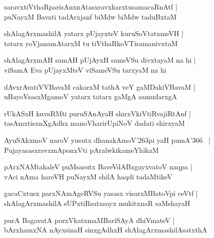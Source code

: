 \documentclass[twoside,12pt,openright]{book}
\def\S{\char'263}
\newcounter{shloka}[chapter]
\begin{document}
\begin{shloka}%
saravxtiVthaRparisAnxnAtasxravxkarxtusamacaRnAtf |\\
puNayxM Bavati tadArxjanf biMdw biMdw taduBxtaM 
\end{shloka}

\begin{shloka}%
shAlagArxmashilA yatarx pUjayxteV kuruSoVtatxmeVH |\\
tatarx yoVjanamAtarxM tu tiVthaRkoVTisamanivxtaM 
\end{shloka}

\begin{shloka}%
shAlagArxmAH samAH pUjAyxH sameVSu divxtayaM na hi |\\
viSamA Eva pUjayxMteV viSameVSu tarxyaM na hi
\end{shloka}

\begin{shloka}%
dAvxrAvatiVVBavaM cakarxM tathA veY gaMDakiVBavaM |\\
uBayoVsasxMgamoV yatarx tatarx gaMgA samudarxgA 
\end{shloka}

\begin{shloka}%
rUkASxH kuvaRMti puruSAnAyaH shirxVkiVtiRvajiRtAnf |\\
tasAmxtisxnXgAdhx manoVharirUpiNoV dadati shirxyaM 
\end{shloka}

\begin{shloka}%
AyuSAkxmoV naroV yusutx dhanakAmoV\S pi yaH pumA\char'366 ~|\\
PujayasasxravxmAponxVti pAralwkikameYhikaM 
\end{shloka}

\begin{shloka}%
pArxNAMtakaleV puMsasutx BaveVdABxgayxvatoV naqpa |\\
vAci nAma hareVH puNayxM shilA haqdi tadaMtikeV 
\end{shloka}

\begin{shloka}%
gacaCxtusx parxNAmAgeRVSu yasasx visarxMBatoVpi ceVtf |\\
shAlagArxmashilA sUPxtiRsatxsayx mukitxnaR saMshayaH 
\end{shloka}

\begin{shloka}%
purA BagavatA porxVkatxmaMBariSAyA dhiVmateV |\\
bArxhamxNA nAyxsinaH sinxgAdhxH shAlagArxmashilAsatxthA 
\end{shloka}
\end{document}

